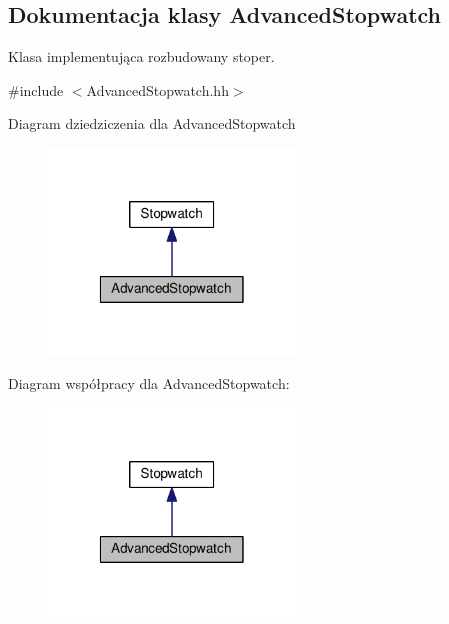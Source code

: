 \hypertarget{class_advanced_stopwatch}{\subsection{Dokumentacja klasy Advanced\-Stopwatch}
\label{class_advanced_stopwatch}
}


Klasa implementująca rozbudowany stoper.  




{\ttfamily \#include $<$Advanced\-Stopwatch.\-hh$>$}



Diagram dziedziczenia dla Advanced\-Stopwatch
\nopagebreak
\begin{figure}[H]
\begin{center}
\leavevmode
\includegraphics[width=186pt]{class_advanced_stopwatch__inherit__graph}
\end{center}
\end{figure}


Diagram współpracy dla Advanced\-Stopwatch\-:
\nopagebreak
\begin{figure}[H]
\begin{center}
\leavevmode
\includegraphics[width=186pt]{class_advanced_stopwatch__coll__graph}
\end{center}
\end{figure}
